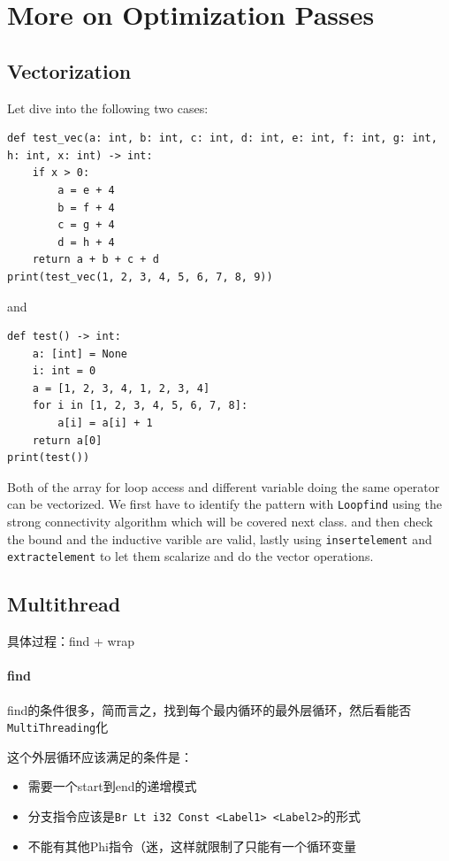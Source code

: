 \documentclass[a4paper]{exam}
\theoremstyle{definition}
\begin{document}
\section{More on Optimization Passes}
\subsection{Vectorization\cite{llvmautovec} \cite{cornellllvmautovec}}
Let dive into the following two cases:
\begin{verbatim}
def test_vec(a: int, b: int, c: int, d: int, e: int, f: int, g: int, h: int, x: int) -> int:
    if x > 0:
        a = e + 4
        b = f + 4
        c = g + 4
        d = h + 4
    return a + b + c + d
print(test_vec(1, 2, 3, 4, 5, 6, 7, 8, 9))
\end{verbatim}
and 
\begin{verbatim}
def test() -> int:
    a: [int] = None
    i: int = 0
    a = [1, 2, 3, 4, 1, 2, 3, 4]
    for i in [1, 2, 3, 4, 5, 6, 7, 8]:
        a[i] = a[i] + 1
    return a[0]
print(test())
\end{verbatim}
Both of the array for loop access and different variable doing the same operator can be vectorized. We first have to identify the pattern with \texttt{Loopfind} using the strong connectivity algorithm which will be covered next class. and then check the bound and the inductive varible are valid, lastly using \texttt{insertelement} and \texttt{extractelement} to let them scalarize and do the vector operations.
\subsection{Multithread}
具体过程：find + wrap

\hypertarget{find}{%
\paragraph{find}\label{find}}

find的条件很多，简而言之，找到每个最内循环的最外层循环，然后看能否\texttt{MultiThreading}化

这个外层循环应该满足的条件是：

\begin{itemize}
\item
  需要一个start到end的递增模式
\item
  分支指令应该是\texttt{Br\ Lt\ i32\ Const\ \textless{}Label1\textgreater{}\ \textless{}Label2\textgreater{}}的形式
\item
  不能有其他Phi指令（迷，这样就限制了只能有一个循环变量
\end{itemize}
\end{document}
